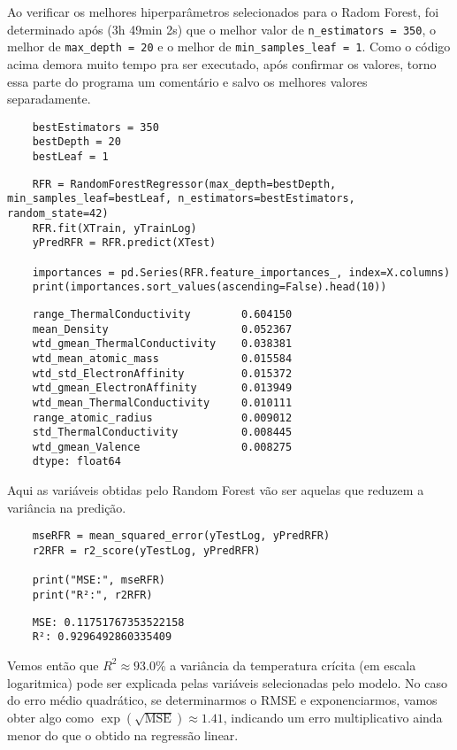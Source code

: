 Ao verificar os melhores hiperparâmetros selecionados para o Radom Forest, foi determinado após (3h 49min 2s) que o melhor valor de \verb|n_estimators = 350|, o melhor de \verb|max_depth = 20| e o melhor de \verb|min_samples_leaf = 1|. Como o código acima demora muito tempo pra ser executado, após confirmar os valores, torno essa parte do programa um comentário e salvo os melhores valores separadamente.
\begin{longlisting}
    \begin{verbatim}
    bestEstimators = 350
    bestDepth = 20
    bestLeaf = 1
    \end{verbatim}
\end{longlisting}
\begin{longlisting}
    \begin{verbatim}
    RFR = RandomForestRegressor(max_depth=bestDepth, min_samples_leaf=bestLeaf, n_estimators=bestEstimators, random_state=42)
    RFR.fit(XTrain, yTrainLog)
    yPredRFR = RFR.predict(XTest)

    importances = pd.Series(RFR.feature_importances_, index=X.columns)
    print(importances.sort_values(ascending=False).head(10))
    \end{verbatim}
\end{longlisting}
\begin{verbatim}
    range_ThermalConductivity        0.604150
    mean_Density                     0.052367
    wtd_gmean_ThermalConductivity    0.038381
    wtd_mean_atomic_mass             0.015584
    wtd_std_ElectronAffinity         0.015372
    wtd_gmean_ElectronAffinity       0.013949
    wtd_mean_ThermalConductivity     0.010111
    range_atomic_radius              0.009012
    std_ThermalConductivity          0.008445
    wtd_gmean_Valence                0.008275
    dtype: float64
\end{verbatim}

Aqui as variáveis obtidas pelo Random Forest vão ser aquelas que reduzem a variância na predição.
\begin{longlisting}
    \begin{verbatim}
    mseRFR = mean_squared_error(yTestLog, yPredRFR)
    r2RFR = r2_score(yTestLog, yPredRFR)

    print("MSE:", mseRFR)
    print("R²:", r2RFR)
    \end{verbatim}
\end{longlisting}
\begin{verbatim}
    MSE: 0.11751767353522158
    R²: 0.9296492860335409
\end{verbatim}

Vemos então que $R^{2} \approx 93.0\%$ a variância da temperatura crícita (em escala logaritmica) pode ser explicada pelas variáveis selecionadas pelo modelo. No caso do erro médio quadrático, se determinarmos o RMSE e exponenciarmos, vamos obter algo como $\exp(\sqrt{\text{MSE}}) \approx 1.41$, indicando um erro multiplicativo ainda menor do que o obtido na regressão linear.